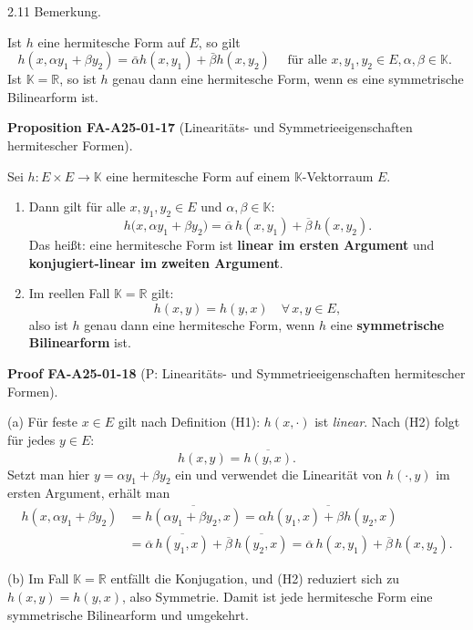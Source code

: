 \documentclass[10pt, letterpaper]{article}
\newcommand{\CustomHeading}[3]{%
  \par\medskip\noindent%
  \textbf{#1 #2} \textnormal{(#3)}.\enskip%
}
\newenvironment{PROP}[2]{\begin{unitbox}\CustomHeading{Proposition}{#1}{#2}}{\end{unitbox}}
\newenvironment{PROOF}[2]{\begin{unitbox}\CustomHeading{Proof}{#1}{#2}}{\end{unitbox}}
\begin{document}
2.11 Bemerkung. 

Ist $h$ eine hermitesche Form auf $E$, so gilt
$$
h\left(x, \alpha y_{1}+\beta y_{2}\right)=\bar{\alpha} h\left(x, y_{1}\right)+\bar{\beta} h\left(x, y_{2}\right) \quad \text { für alle } x, y_{1}, y_{2} \in E, \alpha, \beta \in \mathbb{K} \text {. }
$$
Ist $\mathbb{K}=\mathbb{R}$, so ist $h$ genau dann eine hermitesche Form, wenn es eine symmetrische Bilinearform ist.\\



\begin{PROP}{FA-A25-01-17}{Linearitäts- und Symmetrieeigenschaften hermitescher Formen}
Sei $h:E\times E\to\mathbb{K}$ eine hermitesche Form auf einem $\mathbb{K}$-Vektorraum $E$.

\begin{enumerate}[label=(\alph*)]
\item Dann gilt für alle $x,y_{1},y_{2}\in E$ und $\alpha,\beta\in\mathbb{K}$:
\[
h\big(x,\alpha y_{1}+\beta y_{2}\big)
=\overline{\alpha}\,h(x,y_{1})+\overline{\beta}\,h(x,y_{2}).
\]
Das heißt: eine hermitesche Form ist \textbf{linear im ersten Argument} und \textbf{konjugiert-linear im zweiten Argument}.

\item Im reellen Fall $\mathbb{K}=\mathbb{R}$ gilt:
\[
h(x,y)=h(y,x)\quad\forall\,x,y\in E,
\]
also ist $h$ genau dann eine hermitesche Form, wenn $h$ eine \textbf{symmetrische Bilinearform} ist.
\end{enumerate}
\end{PROP}


\begin{PROOF}{FA-A25-01-18}{P: Linearitäts- und Symmetrieeigenschaften hermitescher Formen}
(a) Für feste $x\in E$ gilt nach Definition (H1): $h(x,\cdot)$ ist \emph{linear}.  
Nach (H2) folgt für jedes $y\in E$:
\[
h(x,y)=\overline{h(y,x)}.
\]
Setzt man hier $y=\alpha y_{1}+\beta y_{2}$ ein und verwendet die Linearität von $h(\cdot,y)$ im ersten Argument, erhält man
\[
\begin{aligned}
h(x,\alpha y_{1}+\beta y_{2})
&=\overline{h(\alpha y_{1}+\beta y_{2},x)}
=\overline{\alpha h(y_{1},x)+\beta h(y_{2},x)}\\
&=\overline{\alpha}\,\overline{h(y_{1},x)}+\overline{\beta}\,\overline{h(y_{2},x)}
=\overline{\alpha}\,h(x,y_{1})+\overline{\beta}\,h(x,y_{2}).
\end{aligned}
\]

(b) Im Fall $\mathbb{K}=\mathbb{R}$ entfällt die Konjugation, und (H2) reduziert sich zu $h(x,y)=h(y,x)$, also Symmetrie. Damit ist jede hermitesche Form eine symmetrische Bilinearform und umgekehrt.
\end{PROOF}
\end{document}
